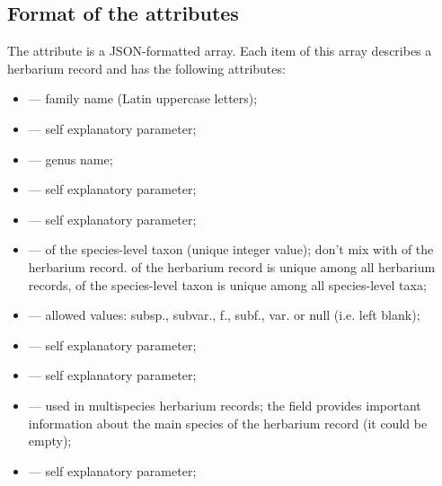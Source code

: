 \documentclass[letterpaper,10pt,english]{sphinxmanual}
\begin{document}
\subsection{Format of the  attributes}
\label{\detokenize{http_api:format-of-the-data-attributes}}
The  attribute is a JSON-formatted array.
Each item of this array describes a herbarium record and
has the following attributes:
\begin{itemize}
\item {} 
 — family name (Latin uppercase letters);

\item {} 
 — self explanatory parameter;

\item {} 
 — genus name;

\item {} 
 — self explanatory parameter;

\item {} 
 — self explanatory parameter;

\item {} 
 —  of the species-level taxon (unique integer value); don’t mix with  of the
herbarium record.   of the herbarium record is unique among
all herbarium records,  of the species-level taxon is unique
among all species-level taxa;

\item {} 
 — allowed values:  subsp., subvar., f., subf., var. or null (i.e. left blank);

\item {} 
 — self explanatory parameter;

\item {} 
 — self explanatory parameter;

\item {} 
 — used in multispecies herbarium records;
the field provides important information about the main species
of the herbarium record (it could be empty);

\item {} 
 — self explanatory parameter;


\end{itemize}
\end{document}
